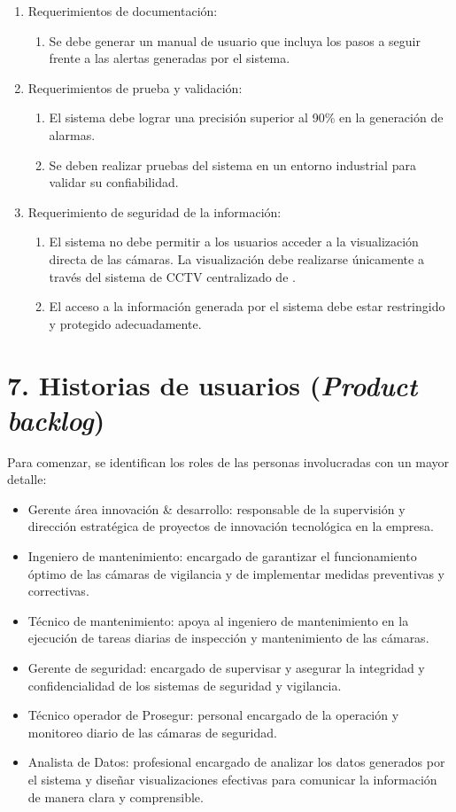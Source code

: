 \documentclass[
11pt, %
]{charter}
\begin{document}
\begin{enumerate}
	\item Requerimientos de documentación:
		\begin{enumerate}
			\item Se debe generar un manual de usuario que incluya los pasos a seguir frente a las alertas generadas por el sistema.
		\end{enumerate}
	\item Requerimientos de prueba y validación:
		\begin{enumerate}
			\item El sistema debe lograr una precisión superior al 90\% en la generación de alarmas.
			\item Se deben realizar pruebas del sistema en un entorno industrial para validar su confiabilidad.
		\end{enumerate}
	\item Requerimiento de seguridad de la información:
		\begin{enumerate}
			\item El sistema no debe permitir a los usuarios acceder a la visualización directa de las cámaras. La visualización debe realizarse únicamente a través del sistema de CCTV centralizado de \empclientename.
			\item El acceso a la información generada por el sistema debe estar restringido y protegido adecuadamente.
		\end{enumerate}
\end{enumerate}

\section{7. Historias de usuarios (\textit{Product backlog})}
\label{sec:backlog}

Para comenzar, se identifican los roles de las personas involucradas con un mayor detalle:

\begin{itemize}
	\item Gerente área innovación \& desarrollo: responsable de la supervisión y dirección estratégica de proyectos de innovación tecnológica en la empresa.
	\item Ingeniero de mantenimiento: encargado de garantizar el funcionamiento óptimo de las cámaras de vigilancia y de implementar medidas preventivas y correctivas.
	\item Técnico de mantenimiento: apoya al ingeniero de mantenimiento en la ejecución de tareas diarias de inspección y mantenimiento de las cámaras.
	\item Gerente de seguridad: encargado de supervisar y asegurar la integridad y confidencialidad de los sistemas de seguridad y vigilancia.
	\item Técnico operador de Prosegur: personal encargado de la operación y monitoreo diario de las cámaras de seguridad.
	\item Analista de Datos: profesional encargado de analizar los datos generados por el sistema y diseñar visualizaciones efectivas para comunicar la información de manera clara y comprensible.
\end{itemize}
\end{document}
